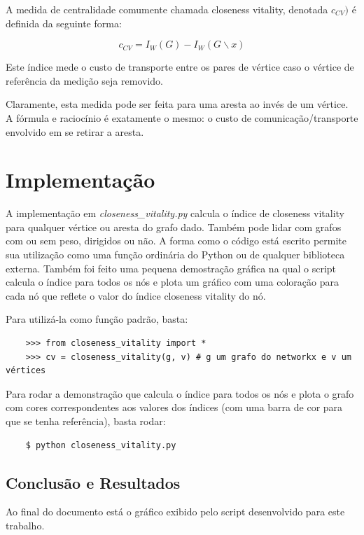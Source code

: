 \documentclass{article}
\begin{document}
A medida de centralidade comumente chamada closeness vitality, denotada $c_{CV})$ é definida da seguinte forma:

\begin{equation}
    c_{CV} = I_W(G) - I_W(G\backslash{x})
\end{equation}

Este índice mede o custo de transporte entre os pares de vértice caso o vértice de referência da medição seja removido.

Claramente, esta medida pode ser feita para uma aresta ao invés de um vértice. A fórmula e raciocínio é exatamente o mesmo: o custo de comunicação/transporte envolvido em se retirar a aresta.

\section{Implementação}
A implementação em \emph{closeness\_vitality.py} calcula o índice de closeness vitality para qualquer vértice ou aresta do grafo dado. Também pode lidar com grafos com ou sem peso, dirigidos ou não. A forma como o código está escrito permite sua utilização como uma função ordinária do Python ou de qualquer biblioteca externa. Também foi feito uma pequena demostração gráfica na qual o script calcula o índice para todos os nós e plota um gráfico com uma coloração para cada nó que reflete o valor do índice closeness vitality do nó.

Para utilizá-la como função padrão, basta:

\begin{verbatim}
    >>> from closeness_vitality import *
    >>> cv = closeness_vitality(g, v) # g um grafo do networkx e v um vértices
\end{verbatim}

Para rodar a demonstração que calcula o índice para todos os nós e plota o grafo com cores correspondentes aos valores dos índices (com uma barra de cor para que se tenha referência), basta rodar:

\begin{verbatim}
    $ python closeness_vitality.py
\end{verbatim}


\subsection{Conclusão e Resultados}
Ao final do documento está o gráfico exibido pelo script desenvolvido para este trabalho.
\end{document}
